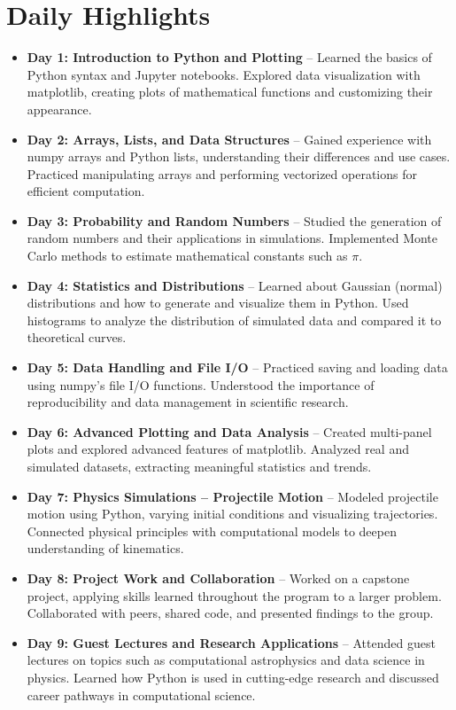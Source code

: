\documentclass[12pt]{article}
\begin{document}
\section*{Daily Highlights}
\begin{itemize}
  \item \textbf{Day 1: Introduction to Python and Plotting} -- Learned the basics of Python syntax and Jupyter notebooks. Explored data visualization with matplotlib, creating plots of mathematical functions and customizing their appearance.
  \item \textbf{Day 2: Arrays, Lists, and Data Structures} -- Gained experience with numpy arrays and Python lists, understanding their differences and use cases. Practiced manipulating arrays and performing vectorized operations for efficient computation.
  \item \textbf{Day 3: Probability and Random Numbers} -- Studied the generation of random numbers and their applications in simulations. Implemented Monte Carlo methods to estimate mathematical constants such as $\pi$.
  \item \textbf{Day 4: Statistics and Distributions} -- Learned about Gaussian (normal) distributions and how to generate and visualize them in Python. Used histograms to analyze the distribution of simulated data and compared it to theoretical curves.
  \item \textbf{Day 5: Data Handling and File I/O} -- Practiced saving and loading data using numpy's file I/O functions. Understood the importance of reproducibility and data management in scientific research.
  \item \textbf{Day 6: Advanced Plotting and Data Analysis} -- Created multi-panel plots and explored advanced features of matplotlib. Analyzed real and simulated datasets, extracting meaningful statistics and trends.
  \item \textbf{Day 7: Physics Simulations -- Projectile Motion} -- Modeled projectile motion using Python, varying initial conditions and visualizing trajectories. Connected physical principles with computational models to deepen understanding of kinematics.
  \item \textbf{Day 8: Project Work and Collaboration} -- Worked on a capstone project, applying skills learned throughout the program to a larger problem. Collaborated with peers, shared code, and presented findings to the group.
  \item \textbf{Day 9: Guest Lectures and Research Applications} -- Attended guest lectures on topics such as computational astrophysics and data science in physics. Learned how Python is used in cutting-edge research and discussed career pathways in computational science.
\end{itemize}
\end{document}
